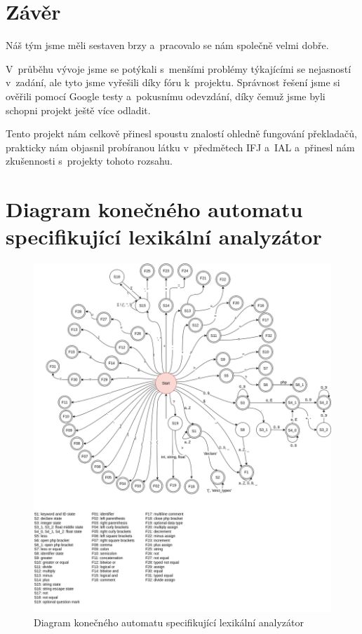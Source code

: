 \documentclass[a4paper, 11pt]{article}
\begin{document}
	\section{Závěr}
    Náš tým jsme měli sestaven brzy  a~pracovalo se nám společně velmi dobře.

	V~průběhu vývoje jsme se potýkali s~menšími problémy týkajícími se nejasností v~zadání, ale
	tyto jsme vyřešili díky fóru k~projektu. Správnost řešení jsme si ověřili pomocí Google testy a~pokusnímu odevzdání, díky čemuž jsme byli schopni projekt ještě více odladit.

	Tento projekt nám celkově přinesl spoustu znalostí ohledně fungování překladačů, prakticky nám
	objasnil probíranou látku v~předmětech IFJ a~IAL a~přinesl nám zkušennosti s~projekty tohoto rozsahu.



	\clearpage
	
	\renewcommand{\refname}{Literatura}
	



	\clearpage
	\appendix


	\section{Diagram konečného automatu specifikující lexikální analyzátor}
	\begin{figure}[!ht]
		\centering
		\includegraphics[width=0.95\linewidth]{fsm.png}
		\caption{Diagram konečného automatu specifikující lexikální analyzátor}
		\label{figure:fa_graph}
	\end{figure}
\end{document}
